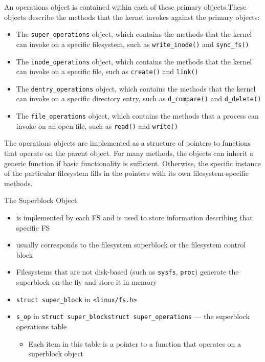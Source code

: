 An operations object is contained within each of these primary objects.These objects
describe the methods that the kernel invokes against the primary objects:
\begin{itemize}
\item The \verb|super_operations| object, which contains the methods that the kernel can
  invoke on a specific filesystem, such as \verb|write_inode()| and \verb|sync_fs()|
\item The \verb|inode_operations| object, which contains the methods that the kernel can
  invoke on a specific file, such as \texttt{create()} and \texttt{link()}
\item The \verb|dentry_operations| object, which contains the methods that the kernel can
  invoke on a specific directory entry, such as \verb|d_compare()| and \verb|d_delete()|
\item The \verb|file_operations| object, which contains the methods that a process can
  invoke on an open file, such as \texttt{read()} and \texttt{write()}
\end{itemize}
  The operations objects are implemented as a structure of pointers to functions that
  operate on the parent object. For many methods, the objects can inherit a generic
  function if basic functionality is sufficient. Otherwise, the specific instance of the
  particular filesystem fills in the pointers with its own filesystem-specific methods.

\begin{frame}
  \begin{block}{The Superblock Object}
    \begin{itemize}
    \item is implemented by each FS and is used to store information describing that
      specific FS
    \item usually corresponds to the \alert{filesystem superblock} or the \alert{filesystem
        control block}
    \item Filesystems that are not disk-based (such as \texttt{sysfs}, \texttt{proc}) generate
      the superblock on-the-fly and store it in memory
    \item \texttt{struct super\_block} in \texttt{<linux/fs.h>}
    \item \texttt{s\_op} in \texttt{struct super\_block}{\pright}\texttt{struct
        super\_operations} --- the superblock operations table
      \begin{itemize}
      \item Each item in this table is a pointer to a function that operates on a
        superblock object
      \end{itemize}
    \end{itemize}
  \end{block}
\end{frame}


